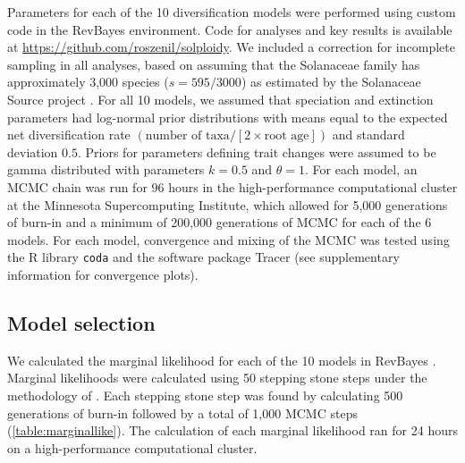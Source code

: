 Parameters for each of the 10 diversification models were performed using custom code in the RevBayes \citep{hoehna_2016} environment. %
Code for analyses and key results is available at \url{https://github.com/roszenil/solploidy}.
We included a correction for incomplete sampling in all analyses, based on assuming that the Solanaceae family has approximately 3,000 species ($s=595/3000$) as estimated by the Solanaceae Source project \citep{solsource}.
For all 10 models, we assumed that speciation and extinction parameters had log-normal prior distributions with means equal to the expected net diversification rate $(\text{number of taxa} / [2 \times \text{root age}])$ and standard deviation $0.5$.
Priors for parameters defining trait changes were assumed to be gamma distributed with parameters $k=0.5$ and $\theta=1$. 
For each model, an MCMC chain was run for 96 hours in the high-performance computational cluster at the Minnesota Supercomputing Institute, which allowed for 5,000 generations of burn-in and a minimum of 200,000 generations of MCMC for each of the 6 models. %
For each model, convergence and mixing of the MCMC was tested using the R library \texttt{coda} and the software package Tracer (see supplementary information for convergence plots). %

\subsection{Model selection}

We calculated the marginal likelihood for each of the 10 models in RevBayes \citep{hoehna_2016}.
Marginal likelihoods were calculated using 50 stepping stone steps under the methodology of \citet{xie_2010}.
Each stepping stone step was found by calculating 500 generations of burn-in followed by a total of 1,000 MCMC steps (\cref{table:marginallike}).
The calculation of each marginal likelihood ran for 24 hours on a high-performance computational cluster.

